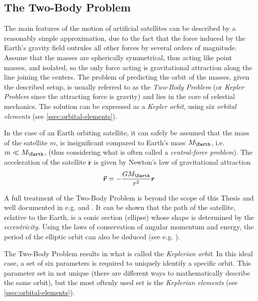 \subsection{The Two-Body Problem}
\label{ssec:two-body-problem}

The main features of the motion of artificial satellites can be described by a
reasonably simple approximation, due to the fact that the force induced by the 
Earth's gravity field outrules all other forces by several orders of magnitude. 
Assume that the masses are spherically symmetrical, thus acting like point masses, 
and isolated, so the only force acting is gravitational attraction along the line 
joining the centers. The problem of predicting the orbit of the masses, given the 
described setup, is usually referred to as the \emph{Two-Body Problem} (or 
\emph{Kepler Problem} since the attracting force is gravity) and lies in the core 
of celestial mechanics. The solution can be expressed as a \emph{Kepler orbit}, using 
six \emph{orbital elements} (see \autoref{ssec:orbital-elements}).

In the case of an Earth orbiting satellite, it can safely be assumed that the mass of 
the satellite $m$, is insignificant compared to Earth's mass $M_{\Earth}$, i.e. 
$m \ll M_{\Earth}$, (thus considering what is often called a 
\emph{central-force problem}). The acceleration of the satellite $\bm{\ddot{r}}$ 
is given by Newton's law of gravitational attraction
\begin{equation}
  \label{eq:mont32}
  \bm{\ddot{r}} = - \frac{G M_{\Earth}}{r^3} \bm{r}
\end{equation}

A full treatment of the Two-Body Problem is beyond the scope of this Thesis and 
well documented in e.g. \cite{Curtis2014} and \cite{Chobotov2002}. It can be shown that 
the path of the satellite, relative to the Earth, is a conic section 
(ellipse) whose shape is determined by the \emph{eccentricity}. Using the laws 
of conservation of angular momentum and energy, the period of the elliptic orbit 
can also be deduced (see e.g. \cite{Curtis2014}).

The Two-Body Problem results in what is called the \emph{Keplerian orbit}.
In this ideal case, a set of six parameters is required to uniquely identify a specific 
orbit. This parameter set in not unique (there are different ways to mathematically 
describe the same orbit), but the most oftenly used set is the \emph{Keplerian elements} 
(see \autoref{ssec:orbital-elements}).

